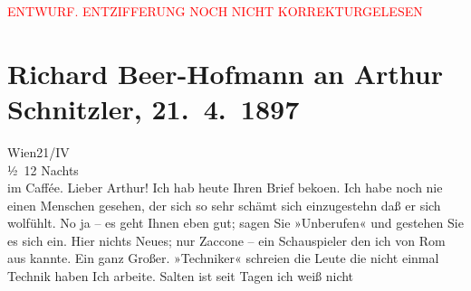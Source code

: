 
\begin{center}
            \textcolor{red}{ENTWURF. ENTZIFFERUNG NOCH NICHT KORREKTURGELESEN}
                      \end{center}
            
               \section[Richard Beer-Hofmann an Arthur Schnitzler, 21. 4. 1897]{ Richard Beer-Hofmann an Arthur Schnitzler,
               21. 4. 1897}\nopagebreak{}\rehead{ }\begin{ledgroupsized}[t]{13cm}\normalsize\beginnumbering{} \toendnotes[C]{\smallbreak\pagebreak[2]} 
\pstart
           \raggedleft{}{\pb}Wien21/IV{\\}½ 12 Nachts{\\}im Caffée.\pend
           \pstart{}Lieber Arthur!\pend\pstart
           Ich hab heute Ihren Brief beko{\geminationm}en. Ich habe noch nie
               einen Menschen gesehen, der sich so sehr schämt sich einzugestehn {\pb}daß er sich wolfühlt. No ja – es
               geht Ihnen eben gut; sagen Sie »Unberufen« und gestehen Sie es sich ein.\pend
           \pstart
           Hier nichts Neues; nur Zaccone – ein Schauspieler
               den ich von Rom aus kannte. {\pb}Ein ganz Großer. »Techniker«
               schreien die Leute die nicht einmal Technik haben\pend
           \pstart
           Ich arbeite. Salten ist seit Tagen ich weiß nicht

\end{ledgroupsized}
